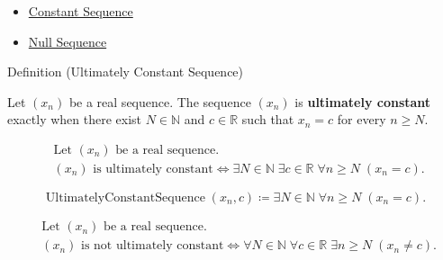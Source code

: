 \begin{dependencies}
\begin{itemize}
  \item \hyperref[def:constant-sequence]{Constant Sequence}
  \item \hyperref[def:null-sequence]{Null Sequence}
\end{itemize}
\end{dependencies}


\begin{definitionbox}{Definition (Ultimately Constant Sequence)}
\begin{definition}
\label{def:ultimately-constant-sequence}
Let $(x_n)$ be a real sequence. The sequence $(x_n)$ is
\textbf{ultimately constant} exactly when there exist $N \in \mathbb{N}$ and
$c \in \mathbb{R}$ such that $x_n = c$ for every $n \ge N$.
\end{definition}
\end{definitionbox}

\begin{remark*}
\[
\begin{aligned}
&\text{Let } (x_n) \text{ be a real sequence.}\\
&(x_n) \text{ is ultimately constant}
\Longleftrightarrow
\exists N \in \mathbb{N}\;
\exists c \in \mathbb{R}\;
\forall n \ge N\;(x_n = c).
\end{aligned}
\]
\end{remark*}

\begin{remark*}
\[
\operatorname{UltimatelyConstantSequence}(x_n,c)
\coloneqq
\exists N \in \mathbb{N}\;
\forall n \ge N\;(x_n = c).
\]
\end{remark*}

\begin{remark*}
\[
\begin{aligned}
&\text{Let } (x_n) \text{ be a real sequence.}\\
&(x_n) \text{ is not ultimately constant}
\Longleftrightarrow
\forall N \in \mathbb{N}\;
\forall c \in \mathbb{R}\;
\exists n \ge N\;(x_n \neq c).
\end{aligned}
\]
\end{remark*}

